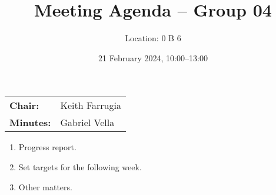 \documentclass{cce2014-meetings}
\title{Meeting Agenda -- Group 04}
\author{Location: 0 B 6}
\date{21 February 2024, 10:00--13:00}
\begin{document}
\maketitle
\begin{center}
        \begin{tabular}{ll}
                \textbf{Chair:}   & Keith Farrugia \\
                \textbf{Minutes:} & Gabriel Vella
        \end{tabular}
\end{center}

\begin{enumerate}
        \item Progress report.
        \item Set targets for the following week.
        \item Other matters.
\end{enumerate}
\end{document}
